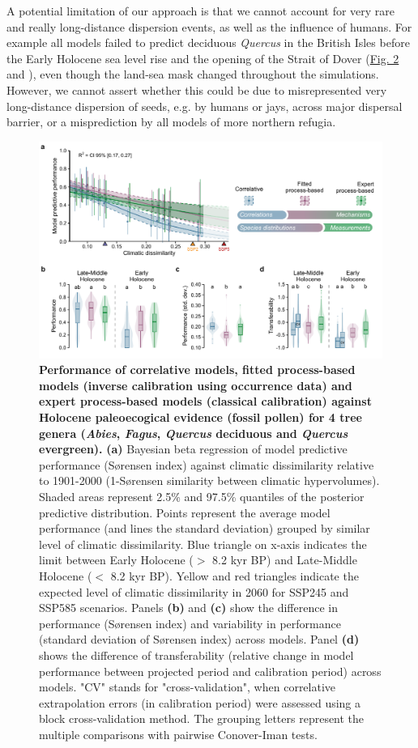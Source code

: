 \documentclass[pdflatex, sn-nature]{sn-jnl}%
\begin{document}
A potential limitation of our approach is that we cannot account for very rare and really long-distance dispersion events, as well as the influence of humans. For example all models failed to predict deciduous \emph{Quercus} in the British Isles before the Early Holocene sea level rise and the opening of the Strait of Dover (\hyperref[quercus_migration]{Fig. 2} and \cite{Smith2011}), even though the land-sea mask changed throughout the simulations. However, we cannot assert whether this could be due to misrepresented very long-distance dispersion of seeds, e.g. by humans or jays, across major dispersal barrier, or a misprediction by all models of more northern refugia.

\begin{figure}[ht]
\centering
\hspace*{-0.8in}
\includegraphics[scale=0.9]{past_performance-1.pdf}
\caption{\textbf{Performance of correlative models, fitted process-based models (inverse calibration using occurrence data) and expert process-based models (classical calibration) against Holocene paleoecogical evidence (fossil pollen) for 4 tree genera (\emph{Abies}, \emph{Fagus}, \emph{Quercus} deciduous and \emph{Quercus} evergreen).} \textbf{(a)} Bayesian beta regression of model predictive performance (Sørensen index) against climatic dissimilarity relative to 1901-2000 (1-Sørensen similarity between climatic hypervolumes). Shaded areas represent 2.5\% and 97.5\% quantiles of the posterior predictive distribution. Points represent the average model performance (and lines the standard deviation) grouped by similar level of climatic dissimilarity. Blue triangle on x-axis indicates the limit between Early Holocene ($>$ 8.2 kyr BP) and Late-Middle Holocene ($<$ 8.2 kyr BP). Yellow and red triangles indicate the expected level of climatic dissimilarity in 2060 for SSP245 and SSP585 scenarios. Panels \textbf{(b)} and \textbf{(c)} show the difference in performance (Sørensen index) and variability in performance (standard deviation of Sørensen index) across models. Panel \textbf{(d)} shows the difference of transferability (relative change in model performance between projected period and calibration period) across models. "CV" stands for "cross-validation", when correlative extrapolation errors (in calibration period) were assessed using a block cross-validation method. The grouping letters represent the multiple comparisons with pairwise Conover-Iman tests. }\label{past_performance}

\end{figure}
\end{document}
